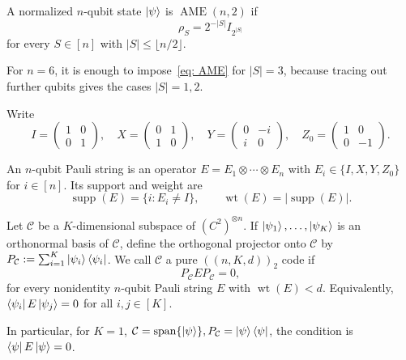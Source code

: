 \begin{definition}
    A normalized $n$-qubit state $\ket{\psi}$ is $\operatorname{AME}(n,2)$ if 
    \begin{equation}\label{eq: AME}
        \rho_S=2^{-\lvert S\rvert} I_{2^{\lvert S\rvert}}
    \end{equation}
    for every $S\in [n]$ with $\lvert S\rvert\leq \lfloor n/2 \rfloor$.
\end{definition}

\begin{remark}
    For $n=6$, it is enough to impose~\eqref{eq: AME} for $\lvert S\rvert=3$, because tracing out further qubits gives the cases $\lvert S\rvert=1,2$.
\end{remark}

Write 
\begin{equation}
    I=\left(\begin{matrix}
        1 & 0\\
        0 & 1
    \end{matrix}\right), \quad
    X=\left(\begin{matrix}
        0 & 1\\
        1 & 0
    \end{matrix}\right), \quad 
    Y=\left(\begin{matrix}
        0 & -i\\
        i & 0
    \end{matrix}\right), \quad
    Z_0=\left(\begin{matrix}
        1 & 0\\
        0 & -1
    \end{matrix}\right).
\end{equation}

An $n$-qubit Pauli string is an operator $E=E_1\otimes \cdots \otimes E_n$ with $E_i\in \{I,X,Y,Z_0\}$ for $i\in [n]$. Its support and weight are 
\begin{equation}
    \operatorname{supp}(E)=\{i:E_i\neq I\}, \quad\quad \operatorname{wt}(E)=\lvert \operatorname{supp}(E)\rvert. 
\end{equation}

\begin{definition}
    Let $\mathcal{C}$ be a $K$-dimensional subspace of $(C^2)^{\otimes n}$. If $\ket{\psi_1},\dots,\ket{\psi_K}$ is an orthonormal basis of $\mathcal{C}$, define the orthogonal projector onto $\mathcal{C}$ by $P_{\mathcal{C}}:=\sum_{i=1}^K\ket{\psi_i}\bra{\psi_i}$. We call $\mathcal{C}$ a pure $((n,K,d))_2$ code if
    \begin{equation}
        P_{\mathcal{C}}EP_{\mathcal{C}}=0,
    \end{equation}
    for every nonidentity $n$-qubit Pauli string $E$ with $\operatorname{wt}(E)<d$. Equivalently, $\bra{\psi_i}E\ket{\psi_j}=0$ for all $i,j\in [K]$.

    In particular, for $K=1$, $\mathcal{C}=\operatorname{span}\{\ket{\psi}\},P_{\mathcal{C}}=\ket{\psi}\bra{\psi}$, the condition is $\bra{\psi}E\ket{\psi}=0$.
\end{definition}

